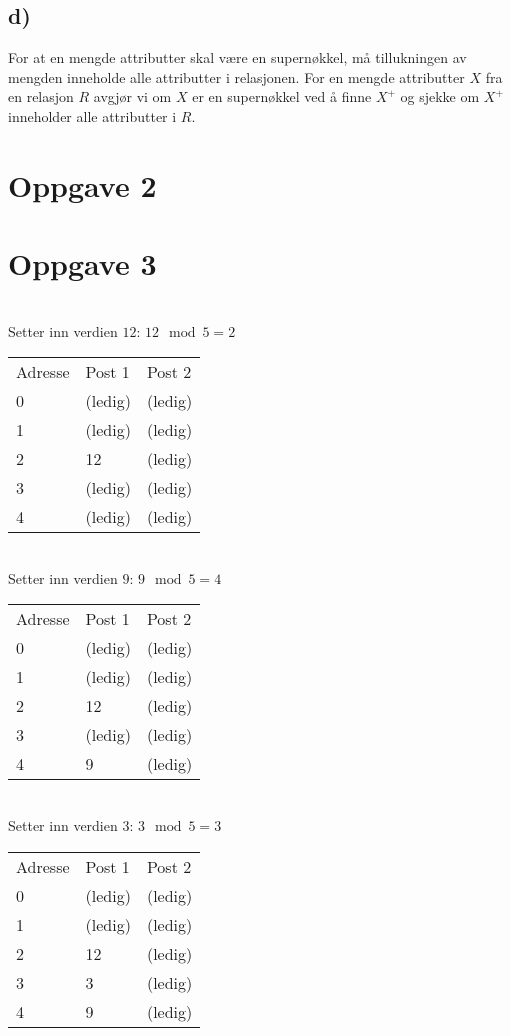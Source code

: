 \documentclass[a4paper, 12pt] {article}
\begin{document}
\subsection{d)}

For at en mengde attributter skal være en supernøkkel, må tillukningen av mengden inneholde alle attributter i relasjonen. For en mengde attributter $X$ fra en relasjon $R$ avgjør vi om $X$ er en supernøkkel ved å finne $X^+$ og sjekke om $X^+$ inneholder alle attributter i $R$.

\section{Oppgave 2}

\newpage
\section{Oppgave 3}
~\\
Setter inn verdien $12$: $12 \mod 5 = 2$\\
\begin{tabular}{|l|l|l|}
    \hline
    Adresse & Post 1 & Post 2 \\
    0       & (ledig)& (ledig)\\
    1       & (ledig)& (ledig)\\
    2       & 12     & (ledig)\\
    3       & (ledig)& (ledig)\\
    4       & (ledig)& (ledig)\\ \hline
\end{tabular}

~\\
Setter inn verdien $9$: $9 \mod 5 = 4$\\
\begin{tabular}{|l|l|l|}
    \hline
    Adresse & Post 1 & Post 2 \\
    0       & (ledig)& (ledig)\\
    1       & (ledig)& (ledig)\\
    2       & 12     & (ledig)\\
    3       & (ledig)& (ledig)\\
    4       & 9      & (ledig)\\ \hline
\end{tabular}

~\\
Setter inn verdien $3$: $3 \mod 5 = 3$\\
\begin{tabular}{|l|l|l|}
    \hline
    Adresse & Post 1 & Post 2 \\
    0       & (ledig)& (ledig)\\
    1       & (ledig)& (ledig)\\
    2       & 12     & (ledig)\\
    3       & 3      & (ledig)\\
    4       & 9      & (ledig)\\ \hline
\end{tabular}
\end{document}
